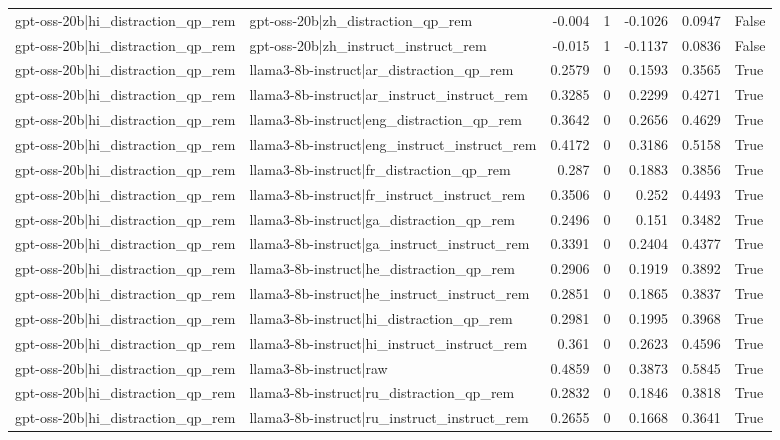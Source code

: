 \begin{table}
\begin{tabular}{l l r r r r l}
gpt-oss-20b|hi_distraction_qp_rem & gpt-oss-20b|zh_distraction_qp_rem & -0.004 & 1 & -0.1026 & 0.0947 & False \\
gpt-oss-20b|hi_distraction_qp_rem & gpt-oss-20b|zh_instruct_instruct_rem & -0.015 & 1 & -0.1137 & 0.0836 & False \\
gpt-oss-20b|hi_distraction_qp_rem & llama3-8b-instruct|ar_distraction_qp_rem & 0.2579 & 0 & 0.1593 & 0.3565 & True \\
gpt-oss-20b|hi_distraction_qp_rem & llama3-8b-instruct|ar_instruct_instruct_rem & 0.3285 & 0 & 0.2299 & 0.4271 & True \\
gpt-oss-20b|hi_distraction_qp_rem & llama3-8b-instruct|eng_distraction_qp_rem & 0.3642 & 0 & 0.2656 & 0.4629 & True \\
gpt-oss-20b|hi_distraction_qp_rem & llama3-8b-instruct|eng_instruct_instruct_rem & 0.4172 & 0 & 0.3186 & 0.5158 & True \\
gpt-oss-20b|hi_distraction_qp_rem & llama3-8b-instruct|fr_distraction_qp_rem & 0.287 & 0 & 0.1883 & 0.3856 & True \\
gpt-oss-20b|hi_distraction_qp_rem & llama3-8b-instruct|fr_instruct_instruct_rem & 0.3506 & 0 & 0.252 & 0.4493 & True \\
gpt-oss-20b|hi_distraction_qp_rem & llama3-8b-instruct|ga_distraction_qp_rem & 0.2496 & 0 & 0.151 & 0.3482 & True \\
gpt-oss-20b|hi_distraction_qp_rem & llama3-8b-instruct|ga_instruct_instruct_rem & 0.3391 & 0 & 0.2404 & 0.4377 & True \\
gpt-oss-20b|hi_distraction_qp_rem & llama3-8b-instruct|he_distraction_qp_rem & 0.2906 & 0 & 0.1919 & 0.3892 & True \\
gpt-oss-20b|hi_distraction_qp_rem & llama3-8b-instruct|he_instruct_instruct_rem & 0.2851 & 0 & 0.1865 & 0.3837 & True \\
gpt-oss-20b|hi_distraction_qp_rem & llama3-8b-instruct|hi_distraction_qp_rem & 0.2981 & 0 & 0.1995 & 0.3968 & True \\
gpt-oss-20b|hi_distraction_qp_rem & llama3-8b-instruct|hi_instruct_instruct_rem & 0.361 & 0 & 0.2623 & 0.4596 & True \\
gpt-oss-20b|hi_distraction_qp_rem & llama3-8b-instruct|raw & 0.4859 & 0 & 0.3873 & 0.5845 & True \\
gpt-oss-20b|hi_distraction_qp_rem & llama3-8b-instruct|ru_distraction_qp_rem & 0.2832 & 0 & 0.1846 & 0.3818 & True \\
gpt-oss-20b|hi_distraction_qp_rem & llama3-8b-instruct|ru_instruct_instruct_rem & 0.2655 & 0 & 0.1668 & 0.3641 & True \\

\end{tabular}
\end{table}
